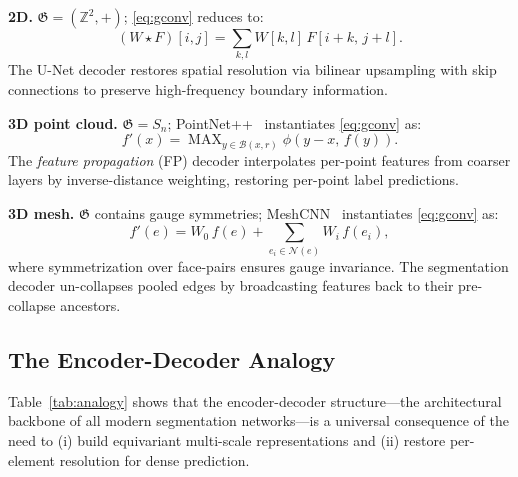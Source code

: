 \documentclass[10pt,conference]{IEEEtran}
\newcommand{\Z}{\mathbb{Z}}
\newcommand{\fG}{\mathfrak{G}}
\DeclareMathOperator{\MAX}{MAX}
\begin{document}
\noindent\textbf{2D.}  $\fG{=}(\Z^2,+)$; \eqref{eq:gconv} reduces to:
\begin{equation}
  (W\star F)[i,j] = \sum_{k,l} W[k,l]\,F[i+k,\,j+l].
  \label{eq:conv2d}
\end{equation}
The U-Net decoder restores spatial resolution via bilinear upsampling with
skip connections to preserve high-frequency boundary information.

\noindent\textbf{3D point cloud.}  $\fG{=}S_n$;
PointNet++~\cite{qi2017pointnetplusplus} instantiates \eqref{eq:gconv} as:
\begin{equation}
  f'(x) = \MAX_{y\in\mathcal{B}(x,r)} \phi(y-x,\,f(y)).
  \label{eq:setabst}
\end{equation}
The \emph{feature propagation} (FP) decoder interpolates per-point features
from coarser layers by inverse-distance weighting, restoring per-point
label predictions.

\noindent\textbf{3D mesh.}  $\fG$ contains gauge symmetries; MeshCNN~\cite{hanocka2019meshcnn}
instantiates \eqref{eq:gconv} as:
\begin{equation}
  f'(e) = W_0\,f(e) + \textstyle\sum_{e_i\in\mathcal{N}(e)} W_i\,f(e_i),
  \label{eq:meshconv}
\end{equation}
where symmetrization over face-pairs ensures gauge invariance.  The
segmentation decoder un-collapses pooled edges by broadcasting features
back to their pre-collapse ancestors.

\subsection{The Encoder-Decoder Analogy}

Table~\ref{tab:analogy} shows that the encoder-decoder structure---the
architectural backbone of all modern segmentation networks---is a
universal consequence of the need to (i) build equivariant multi-scale
representations and (ii) restore per-element resolution for dense
prediction.
\end{document}
